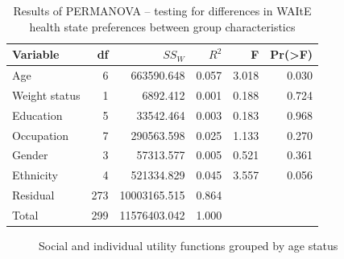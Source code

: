 \documentclass[
  letterpaper,
  DIV=11,
  numbers=noendperiod]{scrartcl}
\begin{document}
\begin{longtable}[]{@{}lrrrrr@{}}

\caption{\label{tbl-permanova}Results of PERMANOVA -- testing for
differences in WAItE health state preferences between group
characteristics}

\tabularnewline

\toprule\noalign{}
Variable & df & \(SS_W\) & \(R^2\) & F & Pr(\textgreater F) \\
\midrule\noalign{}
\endhead
\bottomrule\noalign{}
\endlastfoot
Age & 6 & 663590.648 & 0.057 & 3.018 & 0.030 \\
Weight status & 1 & 6892.412 & 0.001 & 0.188 & 0.724 \\
Education & 5 & 33542.464 & 0.003 & 0.183 & 0.968 \\
Occupation & 7 & 290563.598 & 0.025 & 1.133 & 0.270 \\
Gender & 3 & 57313.577 & 0.005 & 0.521 & 0.361 \\
Ethnicity & 4 & 521334.829 & 0.045 & 3.557 & 0.056 \\
Residual & 273 & 10003165.515 & 0.864 & & \\
Total & 299 & 11576403.042 & 1.000 & & \\

\end{longtable}

\begin{figure}


\caption{\label{fig-age}Social and individual utility functions grouped
by age status}

\end{figure}%
\end{document}
